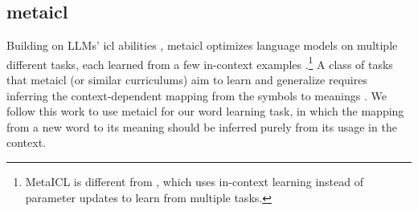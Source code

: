 \documentclass{article}
\begin{document}
\subsection{\acl{metaicl}}
Building on LLMs' \acl{icl} abilities \citep{GPT3}, \acf{metaicl} optimizes language models on multiple different tasks, each learned from a few in-context examples \citep{min-etal-2022-metaicl,chen-etal-2022-meta}.\footnote{MetaICL is different from \citet{cf-metaicl-2023}, which uses in-context learning instead of parameter updates to learn from multiple tasks.}
A class of tasks that \ac{metaicl} (or similar curriculums) aim to learn and generalize requires inferring the context-dependent mapping from the symbols to meanings \citep{Lake2023HumanlikeSG,huang2024lexinvariant,Anand2024DualPL,Park2024ICLR}.
We follow this work to use \ac{metaicl} for our word learning task, in which the mapping from a new word to its meaning should be inferred purely from its usage in the context.


\end{document}
